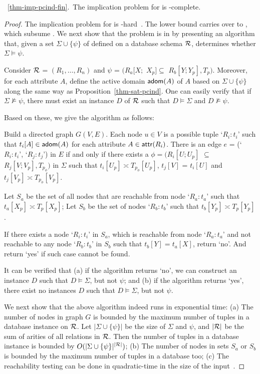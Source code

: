 {%
\vspace{2ex} \noindent{}~\ref{thm-imp-pcind-fin}.~The
implication problem for \pCINDs is \EXPTIME-complete. \eop

\begin{proof} The implication problem for \CINDs is
\EXPTIME-hard~\cite{CINDs}. The lower bound carries over to \pCINDs,
which subsume \CINDs. We next show that the problem is in \EXPTIME
by presenting an \EXPTIME algorithm that, given a set
$\Sigma\cup\{\psi\}$ of \pCINDs defined on a database schema $\cal
R$, determines whether $\Sigma\models\psi$.

Consider $\cal R$ = $(R_1,\ldots,R_n)$ and $\psi$ = $(R_a[X;$ $X_p]
\subseteq$ $R_b[Y;Y_p], T_p)$. Moreover, for each attribute $A$,
define the active domain ${\mathsf{adom}}(A)$ of $A$ based on
$\Sigma\cup\{\psi\}$ along the same way as
Proposition~\ref{thm-sat-pcind}. One can easily verify that if
$\Sigma\not\models\psi$, there must exist an instance $D$ of ${\cal
R}$ such that $D\models\Sigma$ and $D\not\models\psi$.

Based on these, we give the \EXPTIME algorithm as follows:

\bi
\item
Build a directed graph $G(V, E)$.  Each node $u\in V$ is a possible
tuple `$R_i:t_i$' such that $t_i[A]\in {\ensuremath {\mathsf{adom}}}(A)$ for each attribute
$A\in\protect\mathsf{attr}(R_i)$. There is an edge $e$ = (`$R_i:t_i$',
`$R_j:t_j$') in $E$ if and only if there exists a \pCIND $\phi =
(R_i[U; U_p]$ $\subseteq$ $ R_j[V; V_p], T_{p_{\phi}})$ in $\Sigma$
such that $t_i[U_p] \asymp T_{p_{\phi}}[U_p]$, $t_j[V]$ = $t_i[U]$
and $t_j[V_p] \asymp T_{p_{\phi}}[V_p]$.
\item
Let $S_a$ be the set of all nodes that are reachable from node
`$R_a:t_a$' such that $t_a[X_p] \asymp T_{p}[X_p]$;
 Let $S_b$ be the
set of nodes `$R_b:t_b$' such that $t_b[Y_p] \asymp T_{p}[Y_p]$.
\item
If there exists a node `$R_i:t_i$' in $S_a$, which is reachable from
node `$R_a:t_a$' and not reachable to any node `$R_b:t_b$' in $S_b$
such that $t_b[Y] = t_a[X]$, return `no'. And return `yes' if such
case cannot be found. \ei


It can be verified that (a) if the algorithm returns `no', we can
construct an instance $D$ such that $D\models\Sigma$, but not
$\psi$; and (b) if the algorithm returns `yes', there exist no
instances $D$ such that $D\models\Sigma$, but not $\psi$.

We next show that the above algorithm indeed runs in exponential
time: (a) The number of nodes in graph $G$ is bounded by the maximum
number of tuples in a database instance on $\R$. Let
$|\Sigma\cup\{\psi\}|$ be the size of $\Sigma$ and $\psi$, and
$|\cal R|$ be the sum of arities of all relations in $\cal R$. Then
the number of tuples in a database instance is bounded by
$O(|\Sigma\cup\{\psi\}|^{|\cal
 R|})$; (b) The number of nodes in sets $S_a$ or $S_b$ is bounded by
the maximum number of tuples in a database too; (c) The reachability
testing can be done in quadratic-time in the size of the
input~\cite{Papa1994}.


\end{proof}}
